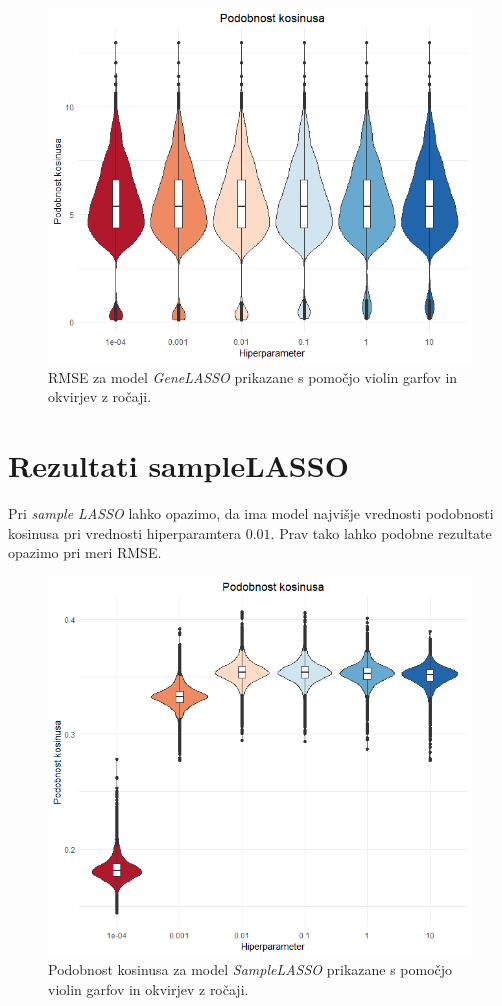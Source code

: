 \documentclass[onecolumn]{report}
\begin{document}
\begin{figure}[!htb]
	\centering
	\includegraphics[width=1\linewidth]{fig/rmse.png}
	\caption{RMSE za model \emph{GeneLASSO} prikazane s pomočjo violin garfov in okvirjev z ročaji.}
	\label{fig:vqvae}
\end{figure}

\section*{Rezultati sampleLASSO}

Pri \emph{sample LASSO} lahko opazimo, da ima model najvišje vrednosti podobnosti kosinusa pri vrednosti hiperparamtera $0.01$. Prav tako lahko podobne rezultate opazimo pri meri RMSE.

\begin{figure}[!htb]
	\centering
	\includegraphics[width=1.1\linewidth]{fig/cosine_sample.png}
	\caption{Podobnost kosinusa za model \emph{SampleLASSO} prikazane s pomočjo violin garfov in okvirjev z ročaji.}
	\label{fig:vqvae}
\end{figure}
\end{document}

